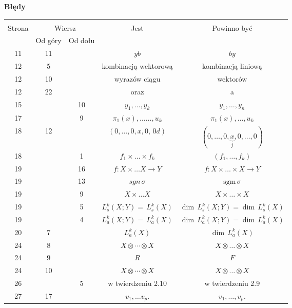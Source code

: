 \documentclass[a4paper,11pt]{article}
\newcommand{\mr}{\mathrm}
\newcommand{\ub}{\underbrace}
\newcommand{\ra}{\rightarrow}
\newcommand{\ld}{\ldots}
\newcommand{\ti}{\times}
\newcommand{\ot}{\otimes}
\newcommand{\sgm}{\mr{sgm}}
\newcommand{\s}{\sigma}
\newcommand{\tb}{\textbf}
\newcommand{\Center}[1]{\begin{center} #1 \end{center}}
\newcommand{\CenterTB}[1]{\Center{\tb{#1}}}
\begin{document}
\newpage
\CenterTB{Błędy}
\begin{center}
  \begin{tabular}{|c|c|c|c|c|}
    \hline
    & \multicolumn{2}{c|}{} & & \\
    Strona & \multicolumn{2}{c|}{Wiersz}& Jest & Powinno być \\ \cline{2-3}
    & Od góry & Od dołu &  &  \\ \hline
    11 & 11 &  & $y b$ & $b y$ \\
    12 &  5 &  & kombinacją wektorową &  kombinacją liniową \\
    12 & 10 & & wyrazów ciągu & wektorów \\
    12 & 22 & & oraz & a \\
    15 & & 10 & $y_{ 1 }, \ld , y_{ k }$ & $y_{ 1 }, \ld , y_{ n }$ \\
    17 & &  9 & $\pi_{ 1 }( x ), \ld\ld, u_{ k }$ & $\pi_{ 1 }( x ), \ld,
                                                   u_{ k }$ \\
    18 & 12 & & $( 0, \ld, 0, x, 0, \, 0d )$
           & $( 0, \ld, 0, \ub{ x }_{ j }, 0, \ld, 0 )$ \\
    18 & & 1 & $f_{ 1 } \ti \ld \ti f_{ k }$ & $( f_{ 1 }, \ld,
                                               f_{ k } )$ \\
    19 & & 16 & $f : X \ti \ld X \ra Y$ & $f : X \ti \ld \ti X \ra Y$ \\
    19 & & 13 & $sgn\, \s$ & $\sgm\, \s$ \\
    19 & &  9 & $X \ti \ld X$ & $X \ti \ld \ti X$ \\
    19 & &  5 & $L^{ k }_{ s } ( X; Y ) = \, L^{ k }_{ s } ( X )$
           & $\dim \, L^{ k }_{ s } ( X; Y )
             = \dim \, L^{ k }_{ s } ( X )$ \\
    19 & & 4 & $L^{ k }_{ a } ( X; Y ) = \, L^{ k }_{ a } ( X )$
           & $\dim \, L^{ k }_{ a } ( X; Y )
             = \dim \, L^{ k }_{ a } ( X )$ \\
    20 &  7 & & $L_{ a }^{ k }( X )$ & $\dim \, L_{ a }^{ k }( X )$ \\
    24 &  8 & & $X \ot \cdots \ot X$ & $X \ot \ld \ot X$ \\
    24 &  9 & & $R$ & $F$ \\
    24 & 10 & & $X \ot \cdots \ot X$ & $X \ot \ld \ot X$ \\
    26 & & 5 & w twierdzeniu 2.10 & w twierdzeniu 2.9 \\
    27 & 17 & & $v_{ 1 }, \ld v_{ p }$. & $v_{ 1 }, \ld, v_{ p }$. \\

\end{tabular}
\end{center}
\end{document}
